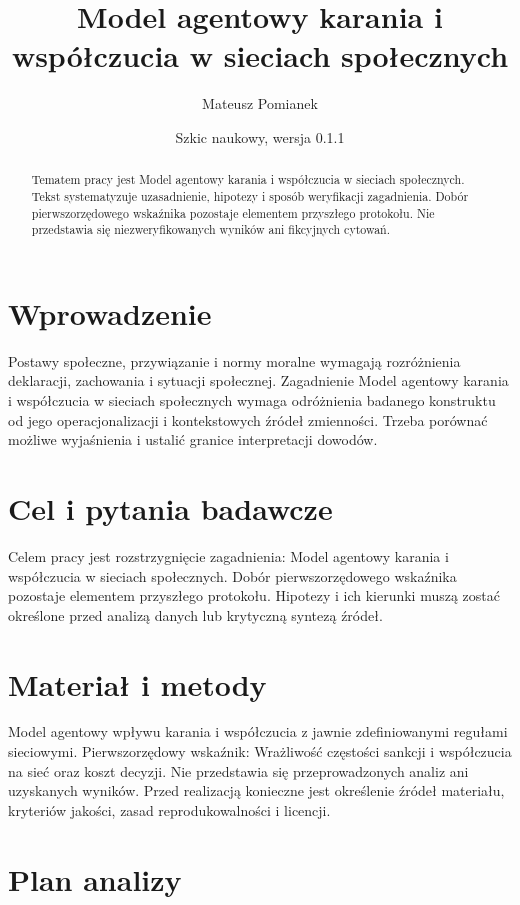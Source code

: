 \documentclass[11pt,a4paper]{article}
\title{Model agentowy karania i współczucia w sieciach społecznych}
\author{Mateusz Pomianek}
\date{Szkic naukowy, wersja 0.1.1}
\begin{document}
\maketitle

\begin{abstract}

Tematem pracy jest Model agentowy karania i współczucia w sieciach społecznych. Tekst systematyzuje uzasadnienie, hipotezy i sposób weryfikacji zagadnienia. Dobór pierwszorzędowego wskaźnika pozostaje elementem przyszłego protokołu. Nie przedstawia się niezweryfikowanych wyników ani fikcyjnych cytowań.

\end{abstract}

\section{Wprowadzenie}

Postawy społeczne, przywiązanie i normy moralne wymagają rozróżnienia deklaracji, zachowania i sytuacji społecznej. Zagadnienie Model agentowy karania i współczucia w sieciach społecznych wymaga odróżnienia badanego konstruktu od jego operacjonalizacji i kontekstowych źródeł zmienności. Trzeba porównać możliwe wyjaśnienia i ustalić granice interpretacji dowodów.

\section{Cel i pytania badawcze}

Celem pracy jest rozstrzygnięcie zagadnienia: Model agentowy karania i współczucia w sieciach społecznych. Dobór pierwszorzędowego wskaźnika pozostaje elementem przyszłego protokołu. Hipotezy i ich kierunki muszą zostać określone przed analizą danych lub krytyczną syntezą źródeł.

\section{Materiał i metody}

Model agentowy wpływu karania i współczucia z jawnie zdefiniowanymi regułami sieciowymi. Pierwszorzędowy wskaźnik: Wrażliwość częstości sankcji i współczucia na sieć oraz koszt decyzji. Nie przedstawia się przeprowadzonych analiz ani uzyskanych wyników. Przed realizacją konieczne jest określenie źródeł materiału, kryteriów jakości, zasad reprodukowalności i licencji.

\section{Plan analizy}
\end{document}
